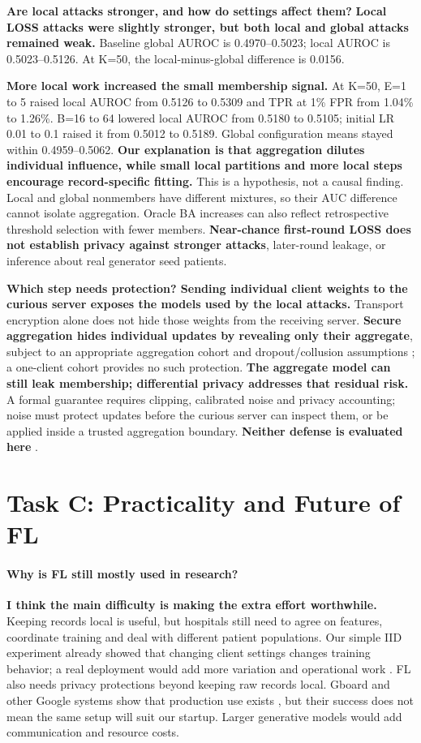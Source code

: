 \documentclass[10pt]{article}
\begin{document}
\textbf{Are local attacks stronger, and how do settings affect them?} \textbf{Local LOSS attacks were slightly stronger, but both local and global attacks remained weak.} Baseline global AUROC is 0.4970--0.5023; local AUROC is 0.5023--0.5126. At K=50, the local-minus-global difference is 0.0156.

\textbf{More local work increased the small membership signal.} At K=50, E=1 to 5 raised local AUROC from 0.5126 to 0.5309 and TPR at 1\% FPR from 1.04\% to 1.26\%. B=16 to 64 lowered local AUROC from 0.5180 to 0.5105; initial LR 0.01 to 0.1 raised it from 0.5012 to 0.5189. Global configuration means stayed within 0.4959--0.5062.
\textbf{Our explanation is that aggregation dilutes individual influence, while
small local partitions and more local steps encourage record-specific fitting.}
This is a hypothesis, not a causal finding. Local and global nonmembers have different mixtures, so their
AUC difference cannot isolate aggregation. Oracle BA increases can also reflect
retrospective threshold selection with fewer members. \textbf{Near-chance first-round LOSS does not establish privacy against stronger
attacks}, later-round leakage, or inference about real generator seed patients.

\textbf{Which step needs protection? Sending individual client weights to the
curious server exposes the models used by the local attacks.}
Transport encryption alone does not hide those weights from the receiving
server. \textbf{Secure aggregation hides individual updates by revealing only their
aggregate}, subject to an
appropriate aggregation cohort and dropout/collusion assumptions
\cite{secureagg}; a one-client cohort provides no such protection.
\textbf{The aggregate model can still leak membership; differential privacy
addresses that residual risk.} A formal guarantee requires clipping, calibrated
noise and privacy accounting; noise
must protect updates before the curious server can inspect them, or be applied
inside a trusted aggregation boundary. \textbf{Neither defense is evaluated here} \cite{dp}.

\section{Task C: Practicality and Future of FL}
\paragraph{Why is FL still mostly used in research?}
\textbf{I think the main difficulty is making the extra effort worthwhile.}
Keeping records local is useful, but hospitals still need to agree on features,
coordinate training and deal with different patient populations. Our simple IID
experiment already showed that changing client settings changes training behavior;
a real deployment would add more variation and operational work \cite{survey}.
FL also needs privacy protections beyond keeping raw records local.
Gboard and other Google systems show that production use exists
\cite{gboard,parfait}, but their success does not mean the same setup will suit
our startup. Larger generative models would add communication and resource costs.
\end{document}
